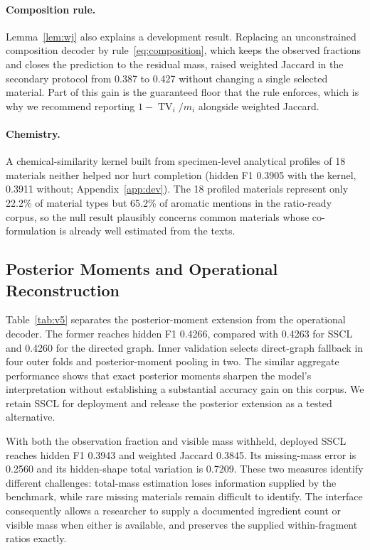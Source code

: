 \documentclass[applsci,article,submit,oneauthor]{Definitions/mdpi}
\newcommand{\TV}{\operatorname{TV}}
\begin{document}
\paragraph{Composition rule.} Lemma~\ref{lem:wj} also explains a development result. Replacing an unconstrained composition decoder by rule~\eqref{eq:composition}, which keeps the observed fractions and closes the prediction to the residual mass, raised weighted Jaccard in the secondary protocol from 0.387 to 0.427 without changing a single selected material. Part of this gain is the guaranteed floor that the rule enforces, which is why we recommend reporting $1-\TV_i/m_i$ alongside weighted Jaccard.

\paragraph{Chemistry.} A chemical-similarity kernel built from specimen-level analytical profiles of 18 materials neither helped nor hurt completion (hidden F1 0.3905 with the kernel, 0.3911 without; Appendix~\ref{app:dev}). The 18 profiled materials represent only 22.2\% of material types but 65.2\% of aromatic mentions in the ratio-ready corpus, so the null result plausibly concerns common materials whose co-formulation is already well estimated from the texts.


\subsection{Posterior Moments and Operational Reconstruction}
\label{sec:operational-results}

Table~\ref{tab:v5} separates the posterior-moment extension from the operational decoder. The former reaches hidden F1 0.4266, compared with 0.4263 for SSCL and 0.4260 for the directed graph. Inner validation selects direct-graph fallback in four outer folds and posterior-moment pooling in two. The similar aggregate performance shows that exact posterior moments sharpen the model's interpretation without establishing a substantial accuracy gain on this corpus. We retain SSCL for deployment and release the posterior extension as a tested alternative.

With both the observation fraction and visible mass withheld, deployed SSCL reaches hidden F1 0.3943 and weighted Jaccard 0.3845. Its missing-mass error is 0.2560 and its hidden-shape total variation is 0.7209. These two measures identify different challenges: total-mass estimation loses information supplied by the benchmark, while rare missing materials remain difficult to identify. The interface consequently allows a researcher to supply a documented ingredient count or visible mass when either is available, and preserves the supplied within-fragment ratios exactly.
\end{document}

